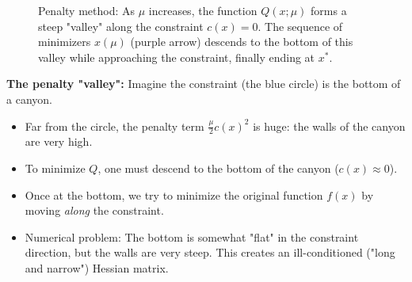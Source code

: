 \begin{figure}[H]
\centering
{}
\caption{Penalty method: As $\mu$ increases, the function $Q(x;\mu)$ forms a steep "valley" along the constraint $c(x)=0$. The sequence of minimizers $x(\mu)$ (purple arrow) descends to the bottom of this valley while approaching the constraint, finally ending at $x^*$.}
\label{fig:penalty-valley}
\end{figure}

\begin{figureexplanation}
\textbf{The penalty "valley":}
Imagine the constraint (the blue circle) is the bottom of a canyon.
\begin{itemize}
    \item Far from the circle, the penalty term $\frac{\mu}{2} c(x)^2$ is huge: the walls of the canyon are very high.
    \item To minimize $Q$, one must descend to the bottom of the canyon ($c(x) \approx 0$).
    \item Once at the bottom, we try to minimize the original function $f(x)$ by moving \emph{along} the constraint.
    \item Numerical problem: The bottom is somewhat "flat" in the constraint direction, but the walls are very steep. This creates an ill-conditioned ("long and narrow") Hessian matrix.
\end{itemize}
\end{figureexplanation}

